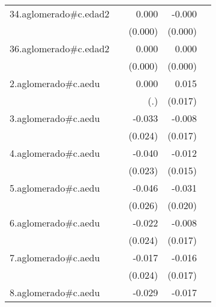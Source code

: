 {\begin{longtable}{l*{4}{D{.}{.}{-1}}}
\addlinespace
34.aglomerado#c.edad2&                     &       0.000         &      -0.000         &                     \\
            &                     &     (0.000)         &     (0.000)         &                     \\
\addlinespace
36.aglomerado#c.edad2&                     &       0.000\sym{*}  &       0.000         &                     \\
            &                     &     (0.000)         &     (0.000)         &                     \\
\addlinespace
2.aglomerado#c.aedu&                     &       0.000         &       0.015         &                     \\
            &                     &         (.)         &     (0.017)         &                     \\
\addlinespace
3.aglomerado#c.aedu&                     &      -0.033         &      -0.008         &                     \\
            &                     &     (0.024)         &     (0.017)         &                     \\
\addlinespace
4.aglomerado#c.aedu&                     &      -0.040         &      -0.012         &                     \\
            &                     &     (0.023)         &     (0.015)         &                     \\
\addlinespace
5.aglomerado#c.aedu&                     &      -0.046         &      -0.031         &                     \\
            &                     &     (0.026)         &     (0.020)         &                     \\
\addlinespace
6.aglomerado#c.aedu&                     &      -0.022         &      -0.008         &                     \\
            &                     &     (0.024)         &     (0.017)         &                     \\
\addlinespace
7.aglomerado#c.aedu&                     &      -0.017         &      -0.016         &                     \\
            &                     &     (0.024)         &     (0.017)         &                     \\
\addlinespace
8.aglomerado#c.aedu&                     &      -0.029         &      -0.017         &                     \\

\end{longtable}}

